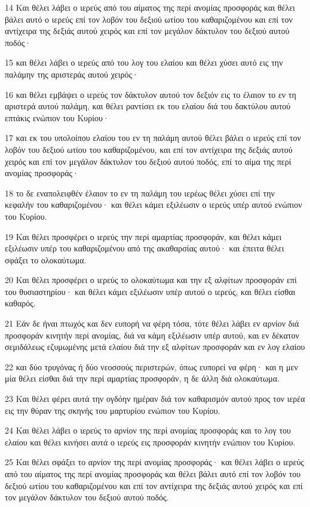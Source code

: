 \par 14 Και θέλει λάβει ο ιερεύς από του αίματος της περί ανομίας προσφοράς και θέλει βάλει αυτό ο ιερεύς επί τον λοβόν του δεξιού ωτίου του καθαριζομένου και επί τον αντίχειρα της δεξιάς αυτού χειρός και επί τον μεγάλον δάκτυλον του δεξιού αυτού ποδός·
\par 15 και θέλει λάβει ο ιερεύς από του λογ του ελαίου και θέλει χύσει αυτό εις την παλάμην της αριστεράς αυτού χειρός·
\par 16 και θέλει εμβάψει ο ιερεύς τον δάκτυλον αυτού τον δεξιόν εις το έλαιον το εν τη αριστερά αυτού παλάμη, και θέλει ραντίσει εκ του ελαίου διά του δακτύλου αυτού επτάκις ενώπιον του Κυρίου·
\par 17 και εκ του υπολοίπου ελαίου του εν τη παλάμη αυτού θέλει βάλει ο ιερεύς επί τον λοβόν του δεξιού ωτίου του καθαριζομένου, και επί τον αντίχειρα της δεξιάς αυτού χειρός και επί τον μεγάλον δάκτυλον του δεξιού αυτού ποδός, επί το αίμα της περί ανομίας προσφοράς·
\par 18 το δε εναπολειφθέν έλαιον το εν τη παλάμη του ιερέως θέλει χύσει επί την κεφαλήν του καθαριζομένου· και θέλει κάμει εξιλέωσιν ο ιερεύς υπέρ αυτού ενώπιον του Κυρίου.
\par 19 Και θέλει προσφέρει ο ιερεύς την περί αμαρτίας προσφοράν, και θέλει κάμει εξιλέωσιν υπέρ του καθαριζομένου από της ακαθαρσίας αυτού· και έπειτα θέλει σφάξει το ολοκαύτωμα.
\par 20 Και θέλει προσφέρει ο ιερεύς το ολοκαύτωμα και την εξ αλφίτων προσφοράν επί του θυσιαστηρίου· και θέλει κάμει εξιλέωσιν υπέρ αυτού ο ιερεύς, και θέλει είσθαι καθαρός.
\par 21 Εάν δε ήναι πτωχός και δεν ευπορή να φέρη τόσα, τότε θέλει λάβει εν αρνίον διά προσφοράν κινητήν περί ανομίας, διά να κάμη εξιλέωσιν υπέρ αυτού, και εν δέκατον σεμιδάλεως εζυμωμένης μετά ελαίου διά την εξ αλφίτων προσφοράν και εν λογ ελαίου
\par 22 και δύο τρυγόνας ή δύο νεοσσούς περιστερών, όπως ευπορεί να φέρη· και η μεν μία θέλει είσθαι διά την περί αμαρτίας προσφοράν, η δε άλλη διά ολοκαύτωμα.
\par 23 Και θέλει φέρει αυτά την ογδόην ημέραν διά τον καθαρισμόν αυτού προς τον ιερέα εις την θύραν της σκηνής του μαρτυρίου ενώπιον του Κυρίου.
\par 24 Και θέλει λάβει ο ιερεύς το αρνίον της περί ανομίας προσφοράς και το λογ του ελαίου και θέλει κινήσει αυτά ο ιερεύς εις προσφοράν κινητήν ενώπιον του Κυρίου.
\par 25 Και θέλει σφάξει το αρνίον της περί ανομίας προσφοράς· και θέλει λάβει ο ιερεύς από του αίματος της περί ανομίας προσφοράς και θέλει βάλει αυτό επί τον λοβόν του δεξιού ωτίου του καθαριζομένου και επί τον αντίχειρα της δεξιάς αυτού χειρός και επί τον μεγάλον δάκτυλον του δεξιού αυτού ποδός.
